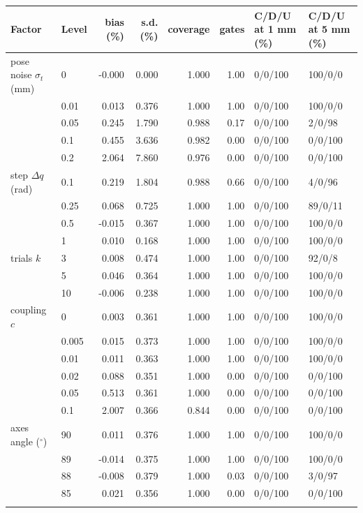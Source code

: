 \begin{tabular}{@{}llrrrrll@{}}\toprule
Factor & Level & bias (\%) & s.d. (\%) & coverage & gates & C/D/U at 1 mm (\%) & C/D/U at 5 mm (\%) \\\midrule
pose noise $\sigma_t$ (mm) & 0 & -0.000 & 0.000 & 1.000 & 1.00 & 0/0/100 & 100/0/0 \\
 & 0.01 & 0.013 & 0.376 & 1.000 & 1.00 & 0/0/100 & 100/0/0 \\
 & 0.05 & 0.245 & 1.790 & 0.988 & 0.17 & 0/0/100 & 2/0/98 \\
 & 0.1 & 0.455 & 3.636 & 0.982 & 0.00 & 0/0/100 & 0/0/100 \\
 & 0.2 & 2.064 & 7.860 & 0.976 & 0.00 & 0/0/100 & 0/0/100 \\
\addlinespace
step $\Delta q$ (rad) & 0.1 & 0.219 & 1.804 & 0.988 & 0.66 & 0/0/100 & 4/0/96 \\
 & 0.25 & 0.068 & 0.725 & 1.000 & 1.00 & 0/0/100 & 89/0/11 \\
 & 0.5 & -0.015 & 0.367 & 1.000 & 1.00 & 0/0/100 & 100/0/0 \\
 & 1 & 0.010 & 0.168 & 1.000 & 1.00 & 0/0/100 & 100/0/0 \\
\addlinespace
trials $k$ & 3 & 0.008 & 0.474 & 1.000 & 1.00 & 0/0/100 & 92/0/8 \\
 & 5 & 0.046 & 0.364 & 1.000 & 1.00 & 0/0/100 & 100/0/0 \\
 & 10 & -0.006 & 0.238 & 1.000 & 1.00 & 0/0/100 & 100/0/0 \\
\addlinespace
coupling $c$ & 0 & 0.003 & 0.361 & 1.000 & 1.00 & 0/0/100 & 100/0/0 \\
 & 0.005 & 0.015 & 0.373 & 1.000 & 1.00 & 0/0/100 & 100/0/0 \\
 & 0.01 & 0.011 & 0.363 & 1.000 & 1.00 & 0/0/100 & 100/0/0 \\
 & 0.02 & 0.088 & 0.351 & 1.000 & 0.00 & 0/0/100 & 0/0/100 \\
 & 0.05 & 0.513 & 0.361 & 1.000 & 0.00 & 0/0/100 & 0/0/100 \\
 & 0.1 & 2.007 & 0.366 & 0.844 & 0.00 & 0/0/100 & 0/0/100 \\
\addlinespace
axes angle ($^\circ$) & 90 & 0.011 & 0.376 & 1.000 & 1.00 & 0/0/100 & 100/0/0 \\
 & 89 & -0.014 & 0.375 & 1.000 & 1.00 & 0/0/100 & 100/0/0 \\
 & 88 & -0.008 & 0.379 & 1.000 & 0.03 & 0/0/100 & 3/0/97 \\
 & 85 & 0.021 & 0.356 & 1.000 & 0.00 & 0/0/100 & 0/0/100 \\
\addlinespace

\end{tabular}
